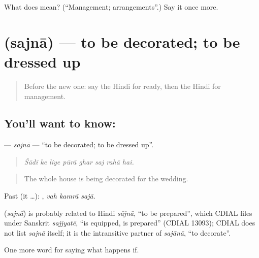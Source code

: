 \begin{tcolorbox}[breakable,colback=teal!4,colframe=teal!35!black,title={Before you move on}]
What does  mean? (\textquotedblleft{}Management; arrangements\textquotedblright{}.) Say it once more.
\end{tcolorbox}
\section[\texorpdfstring{\hi{सजना} (sajnā)}{सजना (sajnā)}]{ (sajnā) — to be decorated; to be dressed up}

\label{lesson:HI-C538-sajna}



\begin{quote}
Before the new one: say the Hindi for ready, then the Hindi for management.
\end{quote}

\subsection*{You'll want to know: }
\textbf{} — \emph{sajnā} — \textquotedblleft{}to be decorated; to be dressed up\textquotedblright{}.

\begin{quote}
       
\end{quote}

\begin{quote}
\emph{Śādī ke liye pūrā ghar saj rahā hai.}
\end{quote}

\begin{quote}
The whole house is being decorated for the wedding.
\end{quote}

Past (it …):   , \emph{vah kamrā sajā}.

\begin{cousinweb}
\textbf{} (\emph{sajnā}) is probably related to Hindi \emph{sājnā}, \textquotedblleft{}to be prepared\textquotedblright{}, which CDIAL files under Sanskrit \emph{sajjyatē}, \textquotedblleft{}is equipped, is prepared\textquotedblright{} (CDIAL 13093); CDIAL does not list \emph{sajnā} itself; it is the intransitive partner of \emph{sajānā}, \textquotedblleft{}to decorate\textquotedblright{}.
\end{cousinweb}

\begin{grammarlens}[title={What you've built}]
One more word for saying what happens if.
\end{grammarlens}

